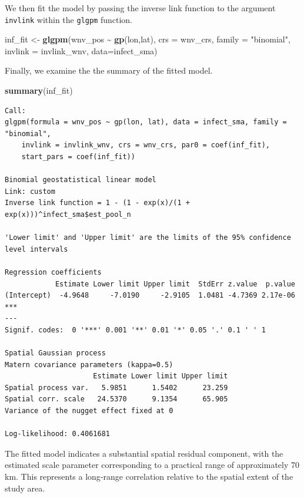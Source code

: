 \documentclass[
  letterpaper,
]{krantz}
\newenvironment{Shaded}{\begin{snugshade}}{\end{snugshade}}
\newcommand{\AttributeTok}[1]{\textcolor[rgb]{0.13,0.29,0.53}{#1}}
\newcommand{\FunctionTok}[1]{\textcolor[rgb]{0.13,0.29,0.53}{\textbf{#1}}}
\newcommand{\NormalTok}[1]{#1}
\newcommand{\OtherTok}[1]{\textcolor[rgb]{0.56,0.35,0.01}{#1}}
\newcommand{\SpecialCharTok}[1]{\textcolor[rgb]{0.81,0.36,0.00}{\textbf{#1}}}
\newcommand{\StringTok}[1]{\textcolor[rgb]{0.31,0.60,0.02}{#1}}
\begin{document}
We then fit the model by passing the inverse link function to the
argument \texttt{invlink} within the \texttt{glgpm} function.

\begin{Shaded}
\begin{Highlighting}[]
\NormalTok{inf\_fit }\OtherTok{\textless{}{-}}
  \FunctionTok{glgpm}\NormalTok{(wnv\_pos }\SpecialCharTok{\textasciitilde{}} \FunctionTok{gp}\NormalTok{(lon,lat),}
        \AttributeTok{crs =}\NormalTok{ wnv\_crs,}
        \AttributeTok{family =} \StringTok{"binomial"}\NormalTok{,}
        \AttributeTok{invlink =}\NormalTok{ invlink\_wnv,}
        \AttributeTok{data=}\NormalTok{infect\_sma)}
\end{Highlighting}
\end{Shaded}

Finally, we examine the the summary of the fitted model.

\begin{Shaded}
\begin{Highlighting}[]
\FunctionTok{summary}\NormalTok{(inf\_fit)}
\end{Highlighting}
\end{Shaded}

\begin{verbatim}
Call:
glgpm(formula = wnv_pos ~ gp(lon, lat), data = infect_sma, family = "binomial", 
    invlink = invlink_wnv, crs = wnv_crs, par0 = coef(inf_fit), 
    start_pars = coef(inf_fit))

Binomial geostatistical linear model
Link: custom 
Inverse link function = 1 - (1 - exp(x)/(1 + exp(x)))^infect_sma$est_pool_n 
 
'Lower limit' and 'Upper limit' are the limits of the 95% confidence level intervals

Regression coefficients
            Estimate Lower limit Upper limit  StdErr z.value  p.value    
(Intercept)  -4.9648     -7.0190     -2.9105  1.0481 -4.7369 2.17e-06 ***
---
Signif. codes:  0 '***' 0.001 '**' 0.01 '*' 0.05 '.' 0.1 ' ' 1

Spatial Gaussian process
Matern covariance parameters (kappa=0.5)
                     Estimate Lower limit Upper limit
Spatial process var.   5.9851      1.5402      23.259
Spatial corr. scale   24.5370      9.1354      65.905
Variance of the nugget effect fixed at 0

Log-likelihood: 0.4061681
\end{verbatim}

The fitted model indicates a substantial spatial residual component,
with the estimated scale parameter corresponding to a practical range of
approximately 70 km. This represents a long‐range correlation relative
to the spatial extent of the study area.
\end{document}
